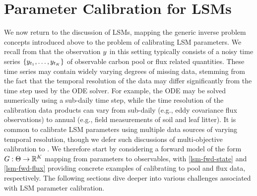 \documentclass[12pt]{article}
\begin{document}
\section{Parameter Calibration for LSMs}
We now return to the discussion of LSMs, mapping the generic inverse problem concepts introduced above to the problem 
of calibrating LSM parameters. We recall from  that the observation $\obs$ in this setting typically 
consists of a noisy time series $\{\obs_{\indexTime[\firstTimeIdxObs]{\Time}}, \dots, \obs_{\indexTime[\lastTimeIdx]{\Time}}\}$
of observable carbon pool or flux related quantities. These time series may contain widely varying degrees of missing data, 
stemming from the fact that the temporal resolution of the data may differ significantly from the time step used by the ODE 
solver. For example, the ODE may be solved numerically using a sub-daily 
time step, while the time resolution of the calibration data products can vary from sub-daily (e.g., eddy covariance flux observations) 
to annual (e.g., field measurements of soil and leaf litter). It is common to calibrate LSM parameters using multiple data sources of 
varying temporal resolution, though we defer such discussions of multi-objective calibration to . 
We therefore start by considering a forward model of the form $\fwd: \parSpace \to \R^{\Ntime}$ mapping from parameters 
to observables, with \ref{lsm-fwd-state} and \ref{lsm-fwd-flux} providing concrete examples of calibrating to pool and flux 
data, respectively. The following sections dive deeper into various challenges associated with LSM parameter calibration. 
\end{document}
